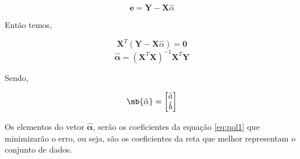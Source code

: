 \[\textbf{e} = \textbf{Y} - \textbf{X}\hat{\alpha}\]

Então temos,

\[\textbf{X}^T(\textbf{Y} - \textbf{X}\hat{\alpha})= \textbf{0}\]
\[\bm{\hat{\alpha}} = (\textbf{X}^T\textbf{X})^{-1}\textbf{X}^T\textbf{Y} \]

Sendo,

\[\mb{\hat{\alpha}} =
\begin{bmatrix}
 \hat{a}\\
 \hat{b}\\
\end{bmatrix}
\]

Os elementos do vetor $\bm{\hat{{\alpha}}}$, serão os coeficientes da equação \ref{eq:pol1} que minimizarão o erro, ou seja, são os coeficientes da reta que melhor representam o conjunto de dados.